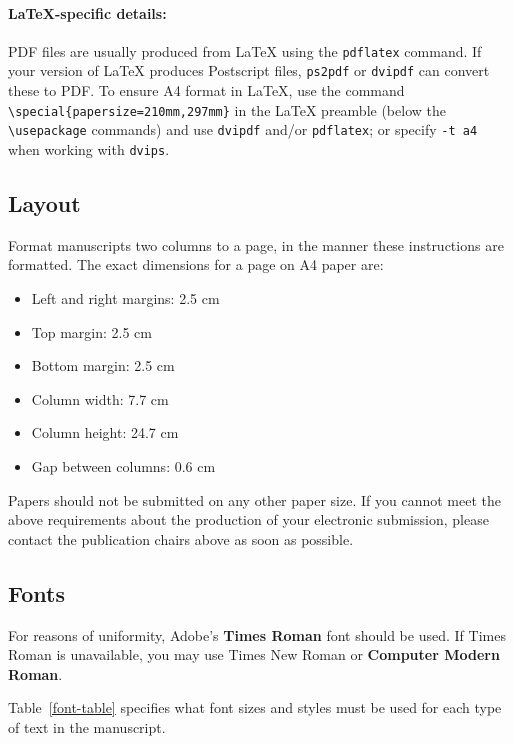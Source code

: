 \documentclass[11pt,a4paper]{article}
\begin{document}
\paragraph{\LaTeX-specific details:}
PDF files are usually produced from \LaTeX{} using the \texttt{\small pdflatex} command.
If your version of \LaTeX{} produces Postscript files, \texttt{\small ps2pdf} or \texttt{\small dvipdf} can convert these to PDF.
To ensure A4 format in \LaTeX, use the command {\small\verb|\special{papersize=210mm,297mm}|}
in the \LaTeX{} preamble (below the {\small\verb|\usepackage|} commands) and use \texttt{\small dvipdf} and/or \texttt{\small pdflatex}; or specify \texttt{\small -t a4} when working with \texttt{\small dvips}.

\subsection{Layout}
\label{ssec:layout}

Format manuscripts two columns to a page, in the manner these
instructions are formatted.
The exact dimensions for a page on A4 paper are:

\begin{itemize}
\item Left and right margins: 2.5 cm
\item Top margin: 2.5 cm
\item Bottom margin: 2.5 cm
\item Column width: 7.7 cm
\item Column height: 24.7 cm
\item Gap between columns: 0.6 cm
\end{itemize}

\noindent Papers should not be submitted on any other paper size.
If you cannot meet the above requirements about the production of your electronic submission, please contact the publication chairs above as soon as possible.

\subsection{Fonts}

For reasons of uniformity, Adobe's \textbf{Times Roman} font should be used.
If Times Roman is unavailable, you may use Times New Roman or \textbf{Computer Modern Roman}.

Table~\ref{font-table} specifies what font sizes and styles must be used for each type of text in the manuscript.
\end{document}
